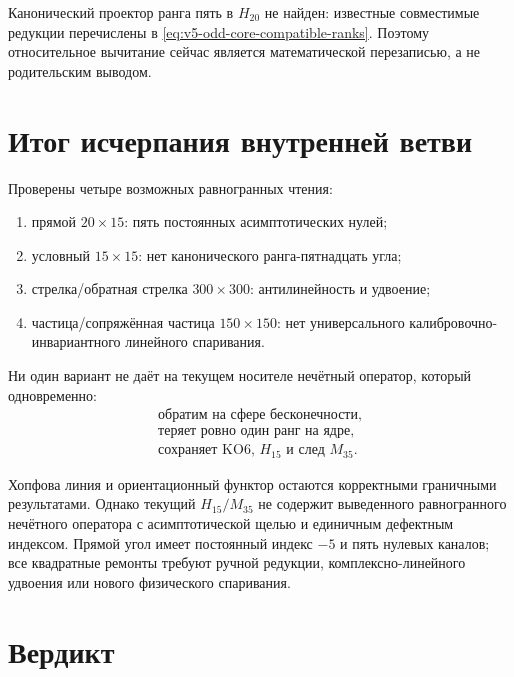 Канонический проектор ранга пять в $H_{20}$ не найден: известные
совместимые редукции перечислены в
\eqref{eq:v5-odd-core-compatible-ranks}. Поэтому относительное вычитание
сейчас является математической перезаписью, а не родительским выводом.

\section{Итог исчерпания внутренней ветви}

Проверены четыре возможных равногранных чтения:
\begin{enumerate}
 \item прямой $20\times15$: пять постоянных асимптотических нулей;
 \item условный $15\times15$: нет канонического ранга-пятнадцать угла;
 \item стрелка/обратная стрелка $300\times300$: антилинейность и удвоение;
 \item частица/сопряжённая частица $150\times150$: нет универсального
 калибровочно-инвариантного линейного спаривания.
\end{enumerate}

Ни один вариант не даёт на текущем носителе нечётный оператор, который
одновременно:
\begin{equation}
 \begin{gathered}
 \text{обратим на сфере бесконечности},\\
 \text{теряет ровно один ранг на ядре},\\
 \text{сохраняет KO6, }H_{15}\text{ и след }M_{35}.
 \end{gathered}
\end{equation}

\begin{theorem}
Хопфова линия и ориентационный функтор остаются корректными граничными
результатами. Однако текущий $H_{15}/M_{35}$ не содержит выведенного
равногранного нечётного оператора с асимптотической щелью и единичным
дефектным индексом. Прямой угол имеет постоянный индекс $-5$ и пять
нулевых каналов; все квадратные ремонты требуют ручной редукции,
комплексно-линейного удвоения или нового физического спаривания.
\end{theorem}

\section{Вердикт}

